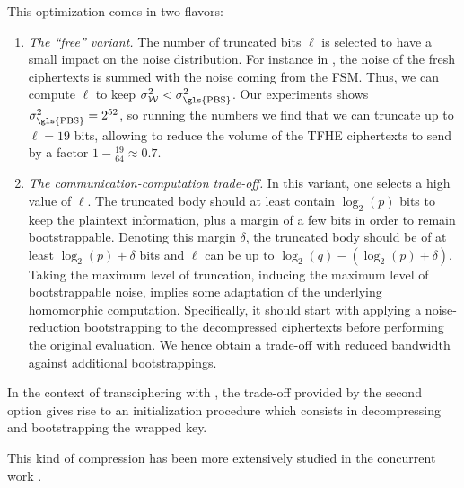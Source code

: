 \noindent This optimization comes in two flavors:
\begin{enumerate}
	\item \emph{The ``free'' variant.} The number of truncated bits $\ell$ is selected to have a small impact on the noise distribution. For instance in \coolName, the noise of the fresh ciphertexts is summed with the noise coming from the FSM. Thus, we can compute $\ell$ to keep $\sigma^2_{\mathcal W} < \sigma^2_{\text{\gls{PBS}}}$. Our experiments shows $\sigma^2_{\text{\gls{PBS}}} = 2^{52}$, so running the numbers we find that we can truncate up to $\ell=19$ bits, allowing to reduce the volume of the \gls{TFHE} ciphertexts to send by a factor $1 - \frac{19}{64} \approx 0.7$.
	
	\smallskip
	
	\item \emph{The communication-computation trade-off.} In this variant, one selects a high value of $\ell$. The truncated body should at least contain $\log_2(p)$ bits to keep the plaintext information, plus a margin of a few bits in order to remain bootstrappable. Denoting this margin $\delta$, the truncated body should be of at least $\log_2(p) + \delta$ bits and $\ell$ can be up to $\log_2(q) - (\log_2(p)+\delta)$. Taking the maximum level of truncation, inducing the maximum level of bootstrappable noise, implies some adaptation of the underlying homomorphic computation. Specifically, it should start with applying a noise-reduction bootstrapping to the decompressed ciphertexts before performing the original evaluation. We hence obtain a trade-off with reduced bandwidth against additional bootstrappings.
\end{enumerate}

In the context of transciphering with \coolName, the trade-off provided by the second option gives rise to an initialization procedure which consists in decompressing and bootstrapping the wrapped key. 

This kind of compression has been more extensively studied in the concurrent work \cite{EPRINT:BCCS24}.

